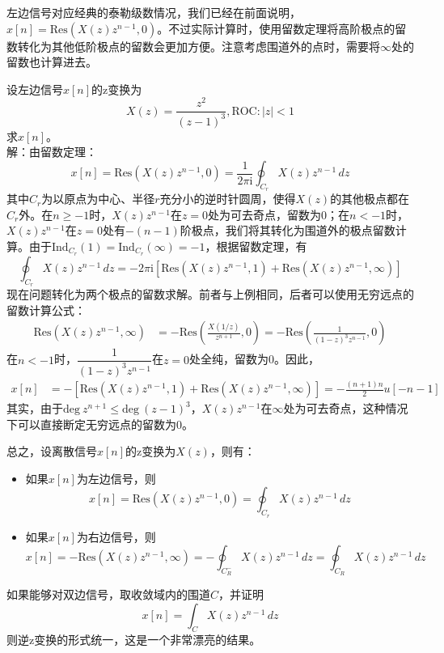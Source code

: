 左边信号对应经典的泰勒级数情况，我们已经在前面说明，$x[n]=\text{Res}\left(X(z)z^{n-1},0\right)$。不过实际计算时，使用留数定理将高阶极点的留数转化为其他低阶极点的留数会更加方便。注意考虑围道外的点时，需要将$\infty$处的留数也计算进去。
\begin{example}
    设左边信号$x[n]$的z变换为
    \[X(z)=\frac{z^2}{(z-1)^3},\text{ROC}:|z|<1\]
    求$x[n]$。\\
    解：由留数定理：
    \[x[n]=\text{Res}\left(X(z)z^{n-1},0\right)=\frac{1}{2\pi \mathrm{i}}\oint_{C_r}X(z)z^{n-1}\,dz\]
    其中$C_r$为以原点为中心、半径$r$充分小的逆时针圆周，使得$X(z)$的其他极点都在$C_r$外。在$n\geq -1$时，$X(z)z^{n-1}$在$z=0$处为可去奇点，留数为0；在$n<-1$时，$X(z)z^{n-1}$在$z=0$处有$-(n-1)$阶极点，我们将其转化为围道外的极点留数计算。由于$\text{Ind}_{C_r}(1)=\text{Ind}_{C_r}(\infty)=-1$，根据留数定理，有
    \[\oint_{C_r}X(z)z^{n-1}\,dz=-2\pi \mathrm{i} \left[\text{Res}\left(X(z)z^{n-1},1\right)+\text{Res}\left(X(z)z^{n-1},\infty\right)\right]\]
    现在问题转化为两个极点的留数求解。前者与上例相同，后者可以使用无穷远点的留数计算公式：
    \begin{align*}
        \text{Res}\left(X(z)z^{n-1},\infty\right)&=-\text{Res}\left(\frac{X(1/z)}{z^{n+1}},0\right)=-\text{Res}\left(\frac{1}{(1-z)^3 z^{n-1}},0\right)
    \end{align*}
    在$n<-1$时，$\dfrac{1}{(1-z)^3 z^{n-1}}$在$z=0$处全纯，留数为0。因此，
    \begin{align*}
        x[n]&=-\left[\text{Res}\left(X(z)z^{n-1},1\right)+\text{Res}\left(X(z)z^{n-1},\infty\right)\right]=-\frac{(n+1)n}{2}u[-n-1]
    \end{align*}
    其实，由于$\text{deg}\ z^{n+1}\leq \text{deg}\ (z-1)^3$，$X(z)z^{n-1}$在$\infty$处为可去奇点，这种情况下可以直接断定无穷远点的留数为0。
\end{example}

总之，设离散信号$x[n]$的z变换为$X(z)$，则有：
\begin{itemize}
    \item 如果$x[n]$为左边信号，则
    \[x[n]=\text{Res}\left(X(z)z^{n-1},0\right)=\oint_{C_r}X(z)z^{n-1}\,dz\]
    \item 如果$x[n]$为右边信号，则
    \[x[n]=-\text{Res}\left(X(z)z^{n-1},\infty\right)=-\oint_{C^-_R}X(z)z^{n-1}\,dz=\oint_{C_R}X(z)z^{n-1}\,dz\]
\end{itemize}
如果能够对双边信号，取收敛域内的围道$C$，并证明
\[x[n]=\int_{C}X(z)z^{n-1}\,dz\]
则逆z变换的形式统一，这是一个非常漂亮的结果。

